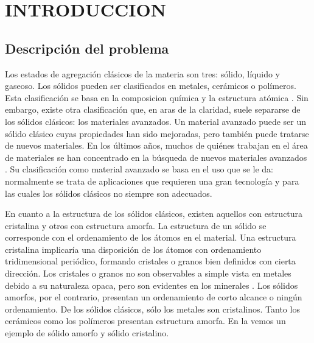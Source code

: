 
\chapter{INTRODUCCION} %

\label{C1} %



\section{Descripción del problema}
\label{S1_1}

Los estados de agregación clásicos de la materia son tres: sólido, líquido y gaseoso. Los sólidos pueden ser clasificados en metales, cerámicos o polímeros. Esta clasificación se basa en la composicion química y la estructura atómica \citep{callister95}. Sin embargo, existe otra clasificación que, en aras de la claridad, suele separarse de los sólidos clásicos: los materiales avanzados. Un material avanzado puede ser un sólido clásico cuyas propiedades han sido mejoradas, pero también puede tratarse de nuevos materiales. En los últimos años, muchos de quiénes trabajan en el área de materiales se han concentrado en la búsqueda de nuevos materiales avanzados \citep{suryana11}. Su clasificación como material avanzado se basa en el uso que se le da: normalmente se trata de aplicaciones que requieren una gran tecnología y para las cuales los sólidos clásicos no siempre son adecuados.

En cuanto a la estructura de los sólidos clásicos, existen aquellos con estructura cristalina y otros con estructura amorfa. La estructura de un sólido se corresponde con el ordenamiento de los átomos en el material. Una estructura cristalina implicaría una disposición de los átomos con ordenamiento tridimensional periódico, formando cristales o granos bien definidos con cierta dirección. Los cristales o granos no son observables a simple vista en metales debido a su naturaleza opaca, pero son evidentes en los minerales \citep{smith96}. Los sólidos amorfos, por el contrario, presentan un ordenamiento de corto alcance o ningún ordenamiento. De los sólidos clásicos, sólo los metales son cristalinos. Tanto los cerámicos como los polímeros presentan estructura amorfa. En la  vemos un ejemplo de sólido amorfo y sólido cristalino.

